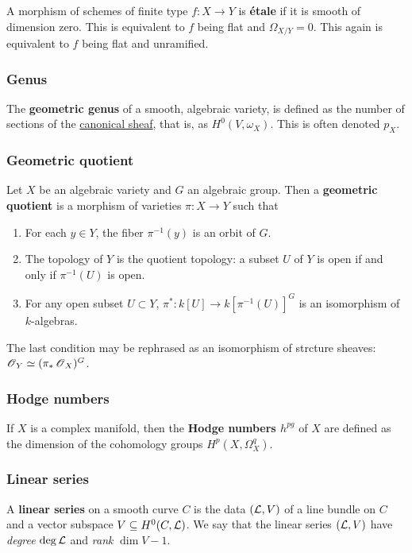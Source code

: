 \documentclass[11pt, english]{article}
\begin{document}
A morphism of schemes of finite type $f:X \to Y$ is \textbf{étale} if it is smooth of dimension zero. This is equivalent to $f$ being flat and $\Omega_{X/Y}=0$. This again is equivalent to $f$ being flat and unramified.

\subsubsection{Genus}
\label{genus}
 
The \textbf{geometric genus} of a smooth, algebraic variety, is defined as the number of sections of the \hyperref[canonicalsheaf]{canonical sheaf}, that is, as $H^0(V,\omega_X)$. This is often denoted $p_X$.

\subsubsection{Geometric quotient}
\label{geometricquotient}

Let $X$ be an algebraic variety and $G$ an algebraic group. Then a \textbf{geometric quotient} is a morphism of varieties $\pi:X \to Y$ such that
\begin{enumerate}
\item For each $y \in Y$, the fiber $\pi^{-1}(y)$ is an orbit of $G$.
\item The topology of $Y$ is the quotient topology: a subset $U$ of $Y$ is open if and only if $\pi^{-1}(U)$ is open.
\item For any open subset $U \subset Y$, $\pi^\ast: k[U] \to k[\pi^{-1}(U)]^G$ is an isomorphism of $k$-algebras.
\end{enumerate}
The last condition may be rephrased as an isomorphism of strcture sheaves: $\operatorname{\mathscr{O}}_Y \simeq (\pi_\ast \operatorname{\mathscr{O}}_X)^G$.   

\subsubsection{Hodge numbers}
\label{hodgenumbers}

If $X$ is a complex manifold, then the \textbf{Hodge numbers $h^{pg}$} of $X$ are defined as the dimension of the cohomology groups $H^p(X,\Omega_X^q)$.

\subsubsection{Linear series}
\label{linearseries}

A \textbf{linear series} on a smooth curve $C$ is the data $(\mathcal{L},V)$ of a line bundle on $C$ and a vector subspace $V \subseteq H^0(C,\mathcal{L})$. We say that the linear series $(\mathcal{L},V)$ have \emph{degree} $\deg \mathcal{L}$ and \emph{rank} $\dim V - 1$. 
\end{document}
